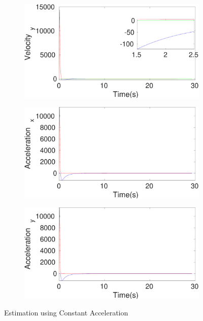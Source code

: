 \begin{figure}[h]
\begin{subfigure}{.5\linewidth}
\end{subfigure}
\begin{subfigure}{.5\linewidth}
\centering
\includegraphics[width=\linewidth]{figures/HInf/s3caHInfVelocity_y}
\end{subfigure}
\begin{subfigure}{.5\linewidth}
\centering
\includegraphics[width=\linewidth]{figures/HInf/s3caHInfAcceleration_x}
\end{subfigure}
\begin{subfigure}{.5\linewidth}
\centering
\includegraphics[width=\linewidth]{figures/HInf/s3caHInfAcceleration_y}
\end{subfigure}
\caption{Estimation using Constant Acceleration}
\end{figure}



